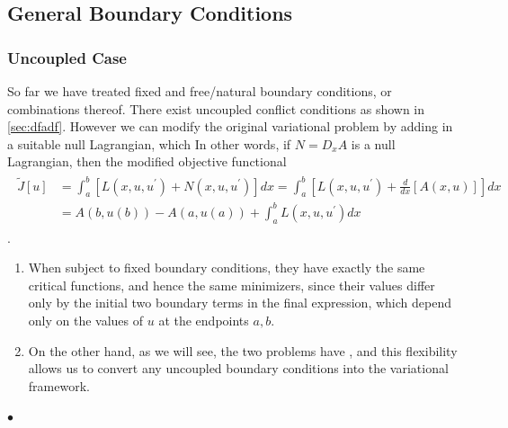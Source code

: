 \documentclass{article}
\begin{document}
\subsection{General Boundary Conditions}
\subsubsection{Uncoupled Case}
So far we have treated fixed and free/natural boundary conditions, or combinations thereof. There exist uncoupled conflict conditions as shown in \cref{sec:dfadf}. However we can modify the original variational problem by adding in a suitable null Lagrangian, which  In other words, if $N=D_{x} A$ is a null Lagrangian, then the modified objective functional
\begin{align*}
\begin{aligned}
\widetilde{J}[u] &=\int_{a}^{b}\left[L\left(x, u, u^{\prime}\right)+N\left(x, u, u^{\prime}\right)\right] d x=\int_{a}^{b}\left[L\left(x, u, u^{\prime}\right)+\frac{d}{d x}[A(x, u)]\right] d x \\
&=A(b, u(b))-A(a, u(a))+\int_{a}^{b} L\left(x, u, u^{\prime}\right) d x
\end{aligned}
\end{align*}
.

\begin{enumerate}
    \item When subject to fixed boundary conditions, they have exactly the same critical functions, and hence the same minimizers, since their values differ only by the initial two boundary terms in the final expression, which depend only on the values of $u$ at the endpoints $a, b$. 
    \item On the other hand, as we will see, the two  problems have , and this flexibility allows us to convert any uncoupled boundary conditions into the variational framework.
\end{enumerate}

$\bullet$ 
\end{document}
